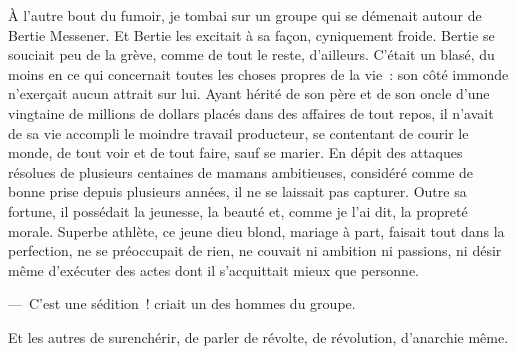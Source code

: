 \documentclass[french,twoside]{book} %
\newcommand{\astermono}{\medskip\centerline{\color{rubric}\large\selectfont{\syms ✻}}\medskip\par}%
\begin{document}
À l’autre bout du fumoir, je tombai sur un groupe qui se démenait autour de Bertie Messener. Et Bertie les excitait à sa façon, cyniquement froide. Bertie se souciait peu de la grève, comme de tout le reste, d’ailleurs. C’était un blasé, du moins en ce qui concernait toutes les choses propres de la vie : son côté immonde n’exerçait aucun attrait sur lui. Ayant hérité de son père et de son oncle d’une vingtaine de millions de dollars placés dans des affaires de tout repos, il n’avait de sa vie accompli le moindre travail producteur, se contentant de courir le monde, de tout voir et de tout faire, sauf se marier. En dépit des attaques résolues de plusieurs centaines de mamans ambitieuses, considéré comme de bonne prise depuis plusieurs années, il ne se laissait pas capturer. Outre sa fortune, il possédait la jeunesse, la beauté et, comme je l’ai dit, la propreté morale. Superbe athlète, ce jeune dieu blond, mariage à part, faisait tout dans la perfection, ne se préoccupait de rien, ne couvait ni ambition ni passions, ni désir même d’exécuter des actes dont il s’acquittait mieux que personne.\par
— C’est une sédition ! criait un des hommes du groupe.\par
Et les autres de surenchérir, de parler de révolte, de révolution, d’anarchie même.\par

\astermono
\end{document}

